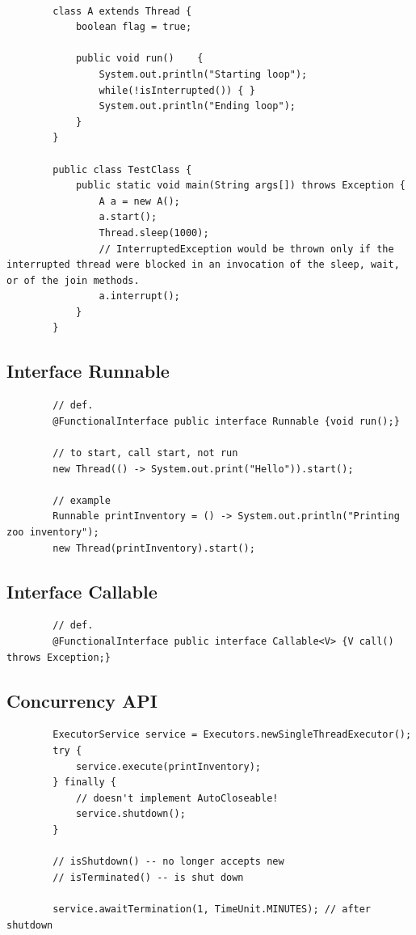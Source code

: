 \documentclass{scrartcl}
\begin{document}
    \begin{lstlisting}

        class A extends Thread {
            boolean flag = true;

            public void run()    {
                System.out.println("Starting loop");
                while(!isInterrupted()) { }
                System.out.println("Ending loop");
            }
        }

        public class TestClass {
            public static void main(String args[]) throws Exception {
                A a = new A();
                a.start();
                Thread.sleep(1000);
                // InterruptedException would be thrown only if the interrupted thread were blocked in an invocation of the sleep, wait, or of the join methods.
                a.interrupt();
            }
        }

    \end{lstlisting}

\subsection{Interface Runnable}
    \begin{lstlisting}
        // def.
        @FunctionalInterface public interface Runnable {void run();}

        // to start, call start, not run
        new Thread(() -> System.out.print("Hello")).start();

        // example
        Runnable printInventory = () -> System.out.println("Printing zoo inventory");
        new Thread(printInventory).start();
    \end{lstlisting}


\subsection{Interface Callable}

    \begin{lstlisting}
        // def.
        @FunctionalInterface public interface Callable<V> {V call() throws Exception;}
    \end{lstlisting}

\subsection{Concurrency API}

    \begin{lstlisting}
        ExecutorService service = Executors.newSingleThreadExecutor();
        try {
            service.execute(printInventory);
        } finally {
            // doesn't implement AutoCloseable!
            service.shutdown();
        }

        // isShutdown() -- no longer accepts new
        // isTerminated() -- is shut down

        service.awaitTermination(1, TimeUnit.MINUTES); // after shutdown


    \end{lstlisting}
\end{document}
